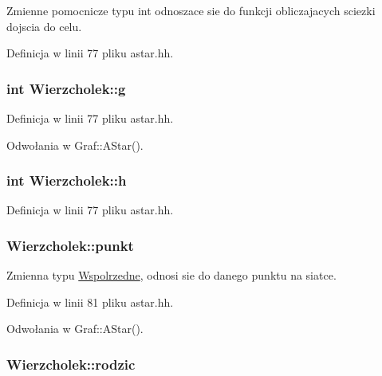 \-Zmienne pomocnicze typu int odnoszace sie do funkcji obliczajacych sciezki dojscia do celu. 



\-Definicja w linii 77 pliku astar.\-hh.

\hypertarget{struct_wierzcholek_a040d7401732673a65daf8cdbdaa7e2c1}{
\subsubsection[{g}]{\setlength{\rightskip}{0pt plus 5cm}int {\bf \-Wierzcholek\-::g}}}\label{struct_wierzcholek_a040d7401732673a65daf8cdbdaa7e2c1}


\-Definicja w linii 77 pliku astar.\-hh.



\-Odwołania w \-Graf\-::\-A\-Star().

\hypertarget{struct_wierzcholek_ac7bb6b2e9a5254904bc67b33b76d34e4}{
\subsubsection[{h}]{\setlength{\rightskip}{0pt plus 5cm}int {\bf \-Wierzcholek\-::h}}}\label{struct_wierzcholek_ac7bb6b2e9a5254904bc67b33b76d34e4}


\-Definicja w linii 77 pliku astar.\-hh.

\hypertarget{struct_wierzcholek_adec40be68641a9c7b6ba1f70da808ba2}{
\subsubsection[{punkt}]{ {\bf \-Wierzcholek\-::punkt}}}\label{struct_wierzcholek_adec40be68641a9c7b6ba1f70da808ba2}


\-Zmienna typu \hyperlink{struct_wspolrzedne}{\-Wspolrzedne}, odnosi sie do danego punktu na siatce. 



\-Definicja w linii 81 pliku astar.\-hh.



\-Odwołania w \-Graf\-::\-A\-Star().

\hypertarget{struct_wierzcholek_a5333fedf15fe355de30763ff2be59eaf}{
\subsubsection[{rodzic}]{ {\bf \-Wierzcholek\-::rodzic}}}\label{struct_wierzcholek_a5333fedf15fe355de30763ff2be59eaf}



